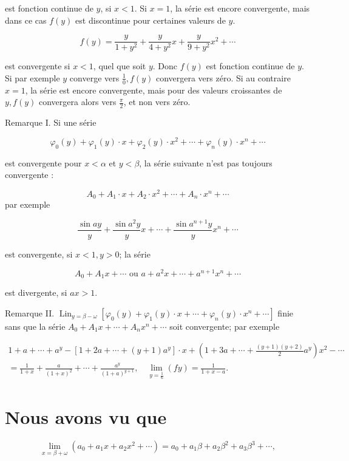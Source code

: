 \documentclass{article}
\begin{document}
est fonction continue de \(y\), si \(x<1\). Si \(x=1\), la série est encore convergente, mais dans ce cas \(f(y)\) est discontinue pour certaines valeurs de \(y\).

\[
f(y)=\frac{y}{1+y^{2}}+\frac{y}{4+y^{2}} x+\frac{y}{9+y^{2}} x^{2}+\cdots
\]

est convergente si \(x<1\), quel que soit \(y\). Donc \(f(y)\) est fonction continue de \(y\). Si par exemple \(y\) converge vers \(\frac{1}{0}, f(y)\) convergera vers zéro. Si au contraire \(x=1\), la série est encore convergente, mais pour des valeurs croissantes de \(y, f(y)\) convergera alors vers \(\frac{\pi}{2}\), et non vers zéro.

Remarque I. Si une série

\[
\varphi_{0}(y)+\varphi_{1}(y) \cdot x+\varphi_{2}(y) \cdot x^{2}+\cdots+\varphi_{n}(y) \cdot x^{n}+\cdots
\]

est convergente pour \(x<\alpha\) et \(y<\beta\), la série suivante n'est pas toujours convergente :

\[
A_{0}+A_{1} \cdot x+A_{2} \cdot x^{2}+\cdots+A_{n} \cdot x^{n}+\cdots
\]
par exemple

\[
\frac{\sin a y}{y}+\frac{\sin a^{2} y}{y} x+\cdots+\frac{\sin a^{n+1} y}{y} x^{n}+\cdots
\]

est convergente, si \(x<1, y>0\); la série

\[
A_{0}+A_{1} x+\cdots \text { ou } a+a^{2} x+\cdots+a^{n+1} x^{n}+\cdots
\]

est divergente, si \(a x>1\).

Remarque II. \(\operatorname{Lin}_{y=\beta-\omega}\left[\varphi_{0}(y)+\varphi_{1}(y) \cdot x+\cdots+\varphi_{n}(y) \cdot x^{n}+\cdots\right]\) finie sans que la série \(A_{0}+A_{1} x+\cdots+A_{n} x^{n}+\cdots\) soit convergente; par exemple

\[
\begin{gathered}
1+a+\cdots+a^{y}-\left[1+2 a+\cdots+(y+1) a^{y}\right] \cdot x+\left(1+3 a+\cdots+\frac{(y+1)(y+2)}{2} a^{y}\right) x^{2}-\cdots \\
=\frac{1}{1+x}+\frac{a}{(1+x)^{2}}+\cdots+\frac{a^{y}}{(1+a)^{y+1}}, \quad \lim _{y=\frac{1}{6}}(f y)=\frac{1}{1+x-a} .
\end{gathered}
\]

\section*{Nous avons vu que}

\[
\lim _{x=\beta+\omega}\left(a_{0}+a_{1} x+a_{2} x^{2}+\cdots\right)=a_{0}+a_{1} \beta+a_{2} \beta^{2}+a_{3} \beta^{3}+\cdots,
\]
\end{document}
